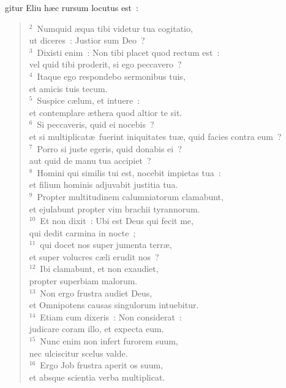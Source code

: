 \bchapter
{}gitur Eliu h\ae c rursum locutus est~:
\begin{flushleft}\begin{verse}\vspace{6pt}${}^{2}$~Numquid \ae qua tibi videtur tua cogitatio,\\ ut diceres~: Justior sum Deo~?\\
${}^{3}$~Dixisti enim~: Non tibi placet quod rectum est~:\\ vel quid tibi proderit, si ego peccavero~?\\
${}^{4}$~Itaque ego respondebo sermonibus tuis,\\ et amicis tuis tecum.\\
${}^{5}$~Suspice c\ae lum, et intuere~:\\ et contemplare \ae thera quod altior te sit.\\
${}^{6}$~Si peccaveris, quid ei nocebis~?\\ et si multiplicat\ae\ fuerint iniquitates tu\ae , quid facies contra eum~?\\
${}^{7}$~Porro si juste egeris, quid donabis ei~?\\ aut quid de manu tua accipiet~?\\
${}^{8}$~Homini qui similis tui est, nocebit impietas tua~:\\ et filium hominis adjuvabit justitia tua.\\
${}^{9}$~Propter multitudinem calumniatorum clamabunt,\\ et ejulabunt propter vim brachii tyrannorum.\\
${}^{10}$~Et non dixit~: Ubi est Deus qui fecit me,\\ qui dedit carmina in nocte~;\\
${}^{11}$~qui docet nos super jumenta terr\ae ,\\ et super volucres c\ae li erudit nos~?\\
${}^{12}$~Ibi clamabunt, et non exaudiet,\\ propter superbiam malorum.\\
${}^{13}$~Non ergo frustra audiet Deus,\\ et Omnipotens causas singulorum intuebitur.\\
${}^{14}$~Etiam cum dixeris~: Non considerat~:\\ judicare coram illo, et expecta eum.\\
${}^{15}$~Nunc enim non infert furorem suum,\\ nec ulciscitur scelus valde.\\
${}^{16}$~Ergo Job frustra aperit os suum,\\ et absque scientia verba multiplicat.\end{verse}\end{flushleft}



